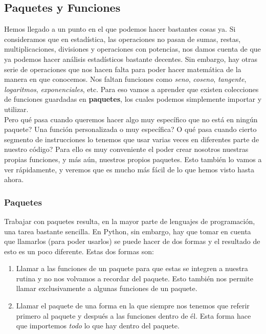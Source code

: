 \documentclass[10pt,letterpaper]{article}
\begin{document}
\subsection{Paquetes y Funciones}
Hemos llegado a un punto en el que podemos hacer bastantes cosas ya. Si consideramos que en estad\'istica, las operaciones no pasan de sumas, restas, multiplicaciones, divisiones y operaciones con potencias, nos damos cuenta de que ya podemos hacer an\'alisis estad\'isticos bastante decentes. Sin embargo, hay otras serie de operaciones que nos hacen falta para poder hacer matem\'atica de la manera en que conocemos. Nos faltan funciones como \emph{seno}, \emph{coseno}, \emph{tangente}, \emph{logaritmos}, \emph{exponenciales}, etc. Para eso vamos a aprender que existen colecciones de funciones guardadas en \textbf{paquetes}, los cuales podemos simplemente importar y utilizar.\\

Pero qu\'e pasa cuando queremos hacer algo muy espec\'ifico que no est\'a en ning\'un paquete? Una funci\'on personalizada o muy espec\'ifica? O qu\'e pasa cuando cierto segmento de instrucciones lo tenemos que usar varias veces en diferentes parte de nuestro c\'odigo? Para ello es muy conveniente el poder crear nosotros nuestras propias funciones, y m\'as a\'un, nuestros propios paquetes. Esto tambi\'en lo vamos a ver r\'apidamente, y veremos que es mucho m\'as f\'acil de lo que hemos visto hasta ahora.

\subsubsection{Paquetes}
Trabajar con paquetes resulta, en la mayor parte de lenguajes de programaci\'on, una tarea bastante sencilla. En Python, sin embargo, hay que tomar en cuenta que llamarlos (para poder usarlos) se puede hacer de dos formas y el resultado de esto es un poco diferente. Estas dos formas son:

\begin{enumerate}
\item Llamar a las funciones de un paquete para que estas se integren a nuestra rutina y no nos volvamos a recordar del paquete. Esto tambi\'en nos permite llamar exclusivamente a algunas funciones de un paquete.
\item Llamar el paquete de una forma en la que siempre nos tenemos que referir primero al paquete y despu\'es a las funciones dentro de \'el. Esta forma hace que importemos \emph{todo} lo que hay dentro del paquete.
\end{enumerate}
\end{document}
